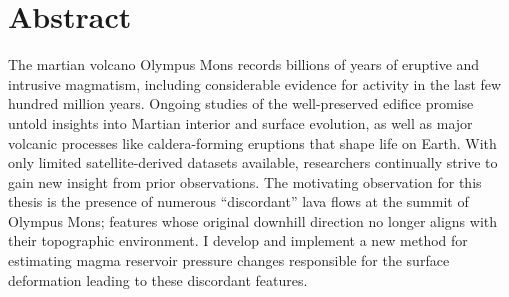 \chapter{Abstract}
The martian volcano Olympus Mons records billions of years of eruptive and intrusive magmatism, including considerable evidence for activity in the last few hundred million years. Ongoing studies of the well-preserved edifice promise untold insights into Martian interior and surface evolution, as well as major volcanic processes like caldera-forming eruptions that shape life on Earth. With only limited satellite-derived datasets available, researchers continually strive to gain new insight from prior observations. The motivating observation for this thesis is the presence of numerous ``discordant'' lava flows at the summit of Olympus Mons; features whose original downhill direction no longer aligns with their topographic environment. I develop and implement a new method for estimating magma reservoir pressure changes responsible for the surface deformation leading to these discordant features.